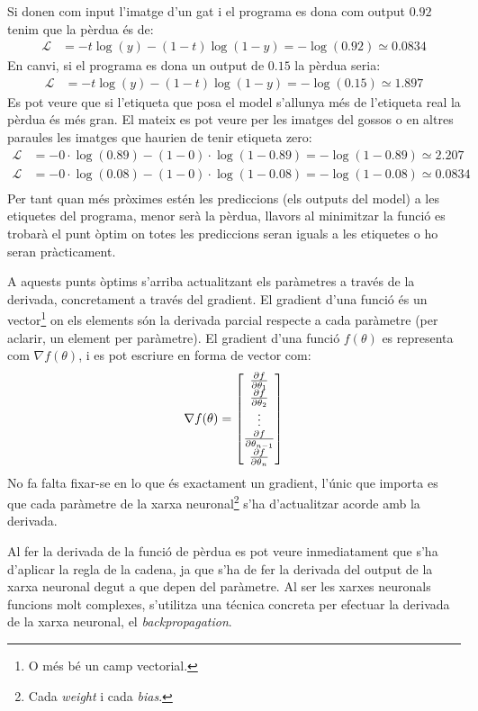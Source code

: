 Si donen com input l'imatge d'un gat i el programa es dona com output $0.92$ tenim que la pèrdua és de:
\begin{align*}
	\mathcal{L} &= - t\log(y) - (1 - t)\log(1 - y) = - \log(0.92) \simeq 0.0834
\end{align*}
En canvi, si el programa es dona un output de $0.15$ la pèrdua seria:
\begin{align*}
	\mathcal{L} &= - t\log(y) - (1 - t)\log(1 - y) = - \log(0.15) \simeq 1.897
\end{align*}
Es pot veure que si l'etiqueta que posa el model s'allunya més de l'etiqueta real la pèrdua és més gran. El mateix es pot veure per les imatges del gossos o en altres paraules les imatges que haurien de tenir etiqueta zero:
\begin{align*}
	\mathcal{L} &= - 0\cdot\log(0.89) - (1 - 0)\cdot\log(1 - 0.89) = - \log(1- 0.89) \simeq 2.207 \\
	\mathcal{L} &= - 0\cdot\log(0.08) - (1 - 0)\cdot\log(1 - 0.08) = - \log(1- 0.08)\simeq 0.0834 \\
\end{align*}
Per tant quan més pròximes estén les prediccions (els outputs del model) a les etiquetes del programa, menor serà la pèrdua, llavors al minimitzar la funció es trobarà el punt òptim on totes les prediccions seran iguals a les etiquetes o ho seran pràcticament. 

A aquests punts òptims s'arriba actualitzant els paràmetres a través de la derivada, concretament a través del gradient. El gradient d'una funció és un vector\footnote{O més bé un camp vectorial.} on els elements són la derivada parcial respecte a cada paràmetre (per aclarir, un element per paràmetre). El gradient d'una funció $f(\theta)$ es representa com $\nabla f(\theta)$, i es pot escriure en forma de vector com:
$$
\nabla f(\theta) = \begin{bmatrix}
	\pdv{f}{\theta_1} \\
	\pdv{f}{\theta_2} \\
	\vdots \\
	\pdv{f}{\theta_{n-1}} \\
	\pdv{f}{\theta_{n}}
\end{bmatrix}
$$
No fa falta fixar-se en lo que és exactament un gradient, l'únic que importa es que cada paràmetre de la xarxa neuronal\footnote{Cada \textit{weight} i cada \textit{bias}.} s'ha d'actualitzar acorde amb la derivada. 

Al fer la derivada de la funció de pèrdua es pot veure inmediatament que s'ha d'aplicar la regla de la cadena, ja que s'ha de fer la derivada del output de la xarxa neuronal degut a que depen del paràmetre. Al ser les xarxes neuronals funcions molt complexes, s'utilitza una técnica concreta per efectuar la derivada de la xarxa neuronal, el \textit{backpropagation}. 

